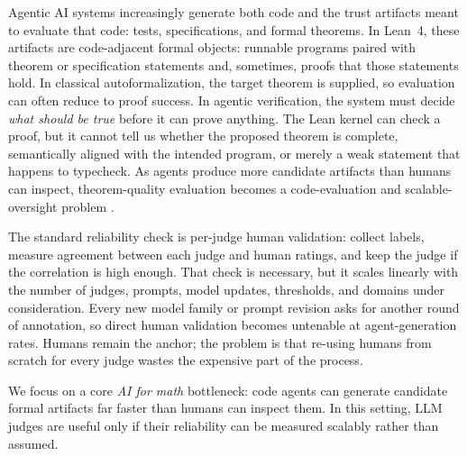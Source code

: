 \documentclass{article}
\begin{document}
Agentic AI systems increasingly generate both code and the trust artifacts meant to evaluate that code: tests, specifications, and formal theorems.
In Lean~4, these artifacts are code-adjacent formal objects: runnable programs paired with theorem or specification statements and, sometimes, proofs that those statements hold.
In classical autoformalization, the target theorem is supplied, so evaluation can often reduce to proof success.
In agentic verification, the system must decide \emph{what should be true} before it can prove anything.
The Lean kernel can check a proof, but it cannot tell us whether the proposed theorem is complete, semantically aligned with the intended program, or merely a weak statement that happens to typecheck.
As agents produce more candidate artifacts than humans can inspect, theorem-quality evaluation becomes a code-evaluation and scalable-oversight problem \citep{bowman2022scalable,zhou2025graders,khattab2024dspy,cheng2024trace}.

The standard reliability check is per-judge human validation: collect labels, measure agreement between each judge and human ratings, and keep the judge if the correlation is high enough.
That check is necessary, but it scales linearly with the number of judges, prompts, model updates, thresholds, and domains under consideration.
Every new model family or prompt revision asks for another round of annotation, so direct human validation becomes untenable at agent-generation rates.
Humans remain the anchor; the problem is that re-using humans from scratch for every judge wastes the expensive part of the process.


We focus on a core \emph{AI for math} bottleneck: code agents can generate candidate formal artifacts far faster than humans can inspect them. In this setting, LLM judges are useful only if their reliability can be measured scalably rather than assumed.
\end{document}
